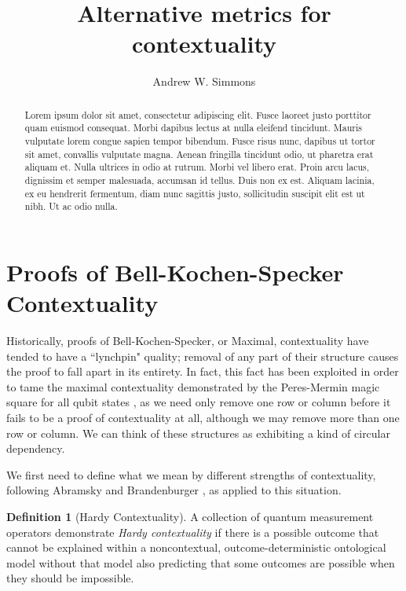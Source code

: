 \documentclass{amsart}
\theoremstyle{definition}
\newtheorem{defn}{Definition}
\begin{document}
\title{Alternative metrics for contextuality}
\author{Andrew W. Simmons}
\address{Department of Physics, Imperial College London, SW7 2AZ.}
\begin{abstract}
Lorem ipsum dolor sit amet, consectetur adipiscing elit. Fusce laoreet justo porttitor quam euismod consequat. Morbi dapibus lectus at nulla eleifend tincidunt. Mauris vulputate lorem congue sapien tempor bibendum. Fusce risus nunc, dapibus ut tortor sit amet, convallis vulputate magna. Aenean fringilla tincidunt odio, ut pharetra erat aliquam et. Nulla ultrices in odio at rutrum. Morbi vel libero erat. Proin arcu lacus, dignissim et semper malesuada, accumsan id tellus. Duis non ex est. Aliquam lacinia, ex eu hendrerit fermentum, diam nunc sagittis justo, sollicitudin suscipit elit est ut nibh. Ut ac odio nulla.
\end{abstract}
\maketitle
\section{Proofs of Bell-Kochen-Specker Contextuality}

Historically, proofs of Bell-Kochen-Specker, or Maximal, contextuality have tended to have a ``lynchpin" quality; removal of any part of their structure causes the proof to fall apart in its entirety.  In fact, this fact has been exploited in order to tame the maximal contextuality demonstrated by the Peres-Mermin magic square for all qubit states \cite{Berm2016}, as we need only remove one row or column before it fails to be a proof of contextuality at all, although we may remove more than one row or column. We can think of these structures as exhibiting a kind of circular dependency.

We first need to define what we mean by different strengths of contextuality, following Abramsky and Brandenburger \cite{Abra2011}, as applied to this situation.

\begin{defn}[Hardy Contextuality]
A collection of quantum measurement operators demonstrate \emph{Hardy contextuality} if there is a possible outcome that cannot be explained within a noncontextual, outcome-deterministic ontological model without that model also predicting that some outcomes are possible when they should be impossible.
\end{defn}
\end{document}
